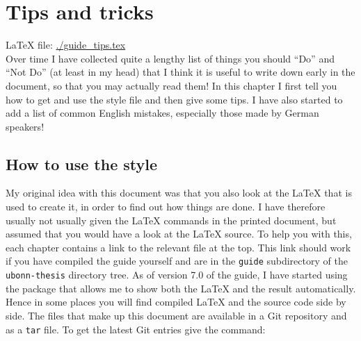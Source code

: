 
\chapter{Tips and tricks}%
\label{sec:tips}

\LaTeX{} file: \url{./guide_tips.tex}\\[1ex]
\noindent
Over time I have collected quite a lengthy list of things you should
\enquote{Do} and \enquote{Not Do} (at least in my head) that I think
it is useful to write down early in the document, so that you may
actually read them!  In this chapter I first tell you how to get
and use the style file and then give some tips.
I have also started to add a list of common English mistakes,
especially those made by German speakers!

\section{How to use the  style}%
\label{sec:tips:howto}

My original idea with this document was that you also look at the \LaTeX{} that
is used to create it, in order to find out how things are done.
I have therefore usually not usually given the \LaTeX{} commands in the printed
document, but assumed that you would have a look at the \LaTeX{} source.
To help you with this, each chapter contains a link to the relevant
file at the top. This link should work if you have compiled the guide
yourself and are in the \texttt{guide} subdirectory of the
\texttt{ubonn-thesis} directory tree.
As of version 7.0 of the guide,
I have started using the  package that allows me to show
both the \LaTeX{} and the result automatically.
Hence in some places you will find compiled \LaTeX{} and the source code side by side.
The files that make up this
document are available in a Git repository and as a
\texttt{tar} file. To get the latest Git entries give the
command:


